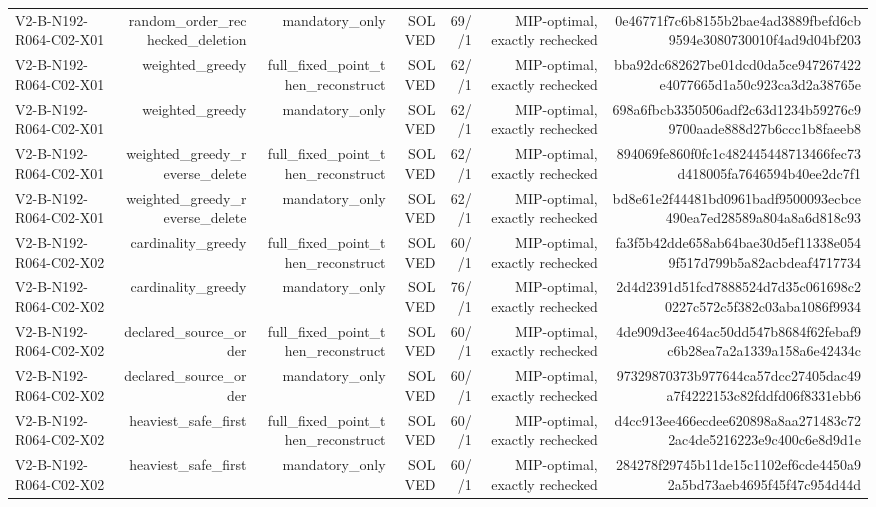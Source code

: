 {\begin{longtable}{lrrrrrr}
V2-B-N192-R064-C02-X01 & random\_order\_rechecked\_deletion & mandatory\_only & SOLVED & 69//1 & MIP-optimal, exactly rechecked & 0e46771f7c6b8155b2bae4ad3889fbefd6cb9594e3080730010f4ad9d04bf203 \\
V2-B-N192-R064-C02-X01 & weighted\_greedy & full\_fixed\_point\_then\_reconstruct & SOLVED & 62//1 & MIP-optimal, exactly rechecked & bba92dc682627be01dcd0da5ce947267422e4077665d1a50c923ca3d2a38765e \\
V2-B-N192-R064-C02-X01 & weighted\_greedy & mandatory\_only & SOLVED & 62//1 & MIP-optimal, exactly rechecked & 698a6fbcb3350506adf2c63d1234b59276c99700aade888d27b6ccc1b8faeeb8 \\
V2-B-N192-R064-C02-X01 & weighted\_greedy\_reverse\_delete & full\_fixed\_point\_then\_reconstruct & SOLVED & 62//1 & MIP-optimal, exactly rechecked & 894069fe860f0fc1c482445448713466fec73d418005fa7646594b40ee2dc7f1 \\
V2-B-N192-R064-C02-X01 & weighted\_greedy\_reverse\_delete & mandatory\_only & SOLVED & 62//1 & MIP-optimal, exactly rechecked & bd8e61e2f44481bd0961badf9500093ecbce490ea7ed28589a804a8a6d818c93 \\
V2-B-N192-R064-C02-X02 & cardinality\_greedy & full\_fixed\_point\_then\_reconstruct & SOLVED & 60//1 & MIP-optimal, exactly rechecked & fa3f5b42dde658ab64bae30d5ef11338e0549f517d799b5a82acbdeaf4717734 \\
V2-B-N192-R064-C02-X02 & cardinality\_greedy & mandatory\_only & SOLVED & 76//1 & MIP-optimal, exactly rechecked & 2d4d2391d51fcd7888524d7d35c061698c20227c572c5f382c03aba1086f9934 \\
V2-B-N192-R064-C02-X02 & declared\_source\_order & full\_fixed\_point\_then\_reconstruct & SOLVED & 60//1 & MIP-optimal, exactly rechecked & 4de909d3ee464ac50dd547b8684f62febaf9c6b28ea7a2a1339a158a6e42434c \\
V2-B-N192-R064-C02-X02 & declared\_source\_order & mandatory\_only & SOLVED & 60//1 & MIP-optimal, exactly rechecked & 97329870373b977644ca57dcc27405dac49a7f4222153c82fddfd06f8331ebb6 \\
V2-B-N192-R064-C02-X02 & heaviest\_safe\_first & full\_fixed\_point\_then\_reconstruct & SOLVED & 60//1 & MIP-optimal, exactly rechecked & d4cc913ee466ecdee620898a8aa271483c722ac4de5216223e9c400c6e8d9d1e \\
V2-B-N192-R064-C02-X02 & heaviest\_safe\_first & mandatory\_only & SOLVED & 60//1 & MIP-optimal, exactly rechecked & 284278f29745b11de15c1102ef6cde4450a92a5bd73aeb4695f45f47c954d44d \\

\end{longtable}}
